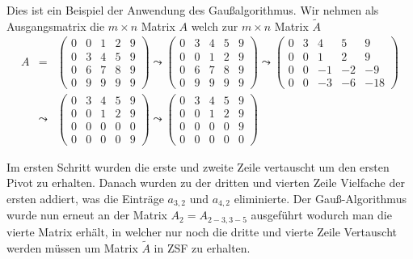 Dies ist ein Beispiel der Anwendung des Gaußalgorithmus.
Wir nehmen als  Ausgangsmatrix die $m\times n$ Matrix $A$ welch zur $m \times n$ Matrix $\tilde{A}$  
\begin{eqnarray*}
A&=&\begin{pmatrix}
0 & 0 & 1 & 2 & 9 \\ 
0 & 3 & 4 & 5 & 9 \\ 
0 & 6 & 7 & 8 & 9 \\ 
0 & 9 & 9 & 9 & 9
\end{pmatrix} 
\leadsto
\begin{pmatrix}
0 & 3 & 4 & 5 & 9 \\ 
0 & 0 & 1 & 2 & 9 \\ 
0 & 6 & 7 & 8 & 9 \\ 
0 & 9 & 9 & 9 & 9
\end{pmatrix}
\leadsto 
\begin{pmatrix}
 0 & 3 & 4 & 5 & 9 \\ 
 0 & 0 & 1 & 2 & 9 \\ 
 0 & 0 & -1 & -2 & -9 \\ 
 0 & 0 & -3 & -6 & -18
\end{pmatrix}\\
&\leadsto &
\begin{pmatrix}
  0 & 3 & 4 & 5 & 9 \\ 
  0 & 0 & 1 & 2 & 9 \\ 
  0 & 0 & 0 & 0 & 0 \\ 
  0 & 0 & 0 & 0 & 9
  \end{pmatrix}
\leadsto
\begin{pmatrix}
  0 & 3 & 4 & 5 & 9 \\ 
  0 & 0 & 1 & 2 & 9 \\ 
  0 & 0 & 0 & 0 & 9 \\ 
  0 & 0 & 0 & 0 & 0
 \end{pmatrix}  
 \end{eqnarray*}
 
 Im ersten Schritt wurden die erste und zweite Zeile vertauscht um den ersten Pivot zu erhalten.
 Danach wurden zu der dritten und vierten Zeile Vielfache der ersten addiert, was die Einträge $a_{3,2}$ und $a_{4,2}$ eliminierte. Der Gauß-Algorithmus wurde nun erneut an der Matrix $A_2=A_{2-3,3-5}$ ausgeführt wodurch man die vierte Matrix erhält, in welcher nur noch die dritte und vierte Zeile Vertauscht werden müssen um Matrix $\tilde{A}$ in ZSF zu erhalten.
